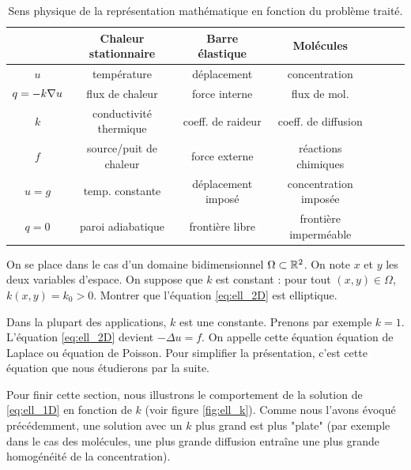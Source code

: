 \documentclass[12pt,a4paper,twoside]{article}
\begin{document}
\begin{table}[h]
  \centering
  \begin{tabular}{|c|c|c|c|c|c|c|}
    \hline
    &Chaleur stationnaire&Barre \'elastique& Mol\'ecules
    \\
    \hline
    $u$ & temp\'erature & d\'eplacement & concentration
    \\
    \hline
    $q=-k\nabla u$ & flux de chaleur & force interne & flux de mol.
    \\
    \hline
    $k$ & conductivit\'e thermique & coeff. de raideur & coeff. de diffusion
    \\
    \hline
    $f$& source/puit de chaleur & force externe & r\'eactions chimiques
    \\
    \hline
    $u=g$ & temp. constante & d\'eplacement impos\'e & concentration impos\'ee
    \\
    \hline
    $q=0$ & paroi adiabatique & fronti\`ere libre & fronti\`ere imperm\'eable
    \\
    \hline
  \end{tabular}
  \caption{Sens physique de la repr\'esentation math\'ematique en fonction
    du probl\`eme trait\'e.}
  \label{tab:pb_ell}
\end{table}


\begin{exercise}
  On se place dans le cas d'un domaine bidimensionnel $\Omega \subset \mathbb{R}^2$.
  On note $x$ et $y$ les deux variables d'espace.
  On suppose que $k$ est constant : pour tout $(x,y) \in \Omega$,
  $k(x,y) = k_0 > 0$.
  Montrer que l'\'equation \eqref{eq:ell_2D} est elliptique.
\end{exercise}

\begin{remark}
  Dans la plupart des applications, $k$ est une constante.
  Prenons par exemple $k=1$.
  L'\'equation \eqref{eq:ell_2D} devient $-\Delta u = f$.
  On appelle cette \'equation \'equation de Laplace ou 
  \'equation de Poisson.
  Pour simplifier la pr\'esentation, c'est cette \'equation que nous \'etudierons
  par la suite.
\end{remark}


Pour finir cette section, nous illustrons le comportement
de la solution de \eqref{eq:ell_1D} en fonction de $k$
(voir figure \ref{fig:ell_k}).
Comme nous l'avons \'evoqu\'e pr\'ec\'edemment, une solution avec 
un $k$ plus grand est plus "plate" 
(par exemple dans le cas des mol\'ecules, une plus grande diffusion entra\^ine 
une plus grande homog\'en\'eit\'e de la concentration).
\end{document}
